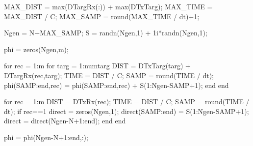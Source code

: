 \documentclass[12pt,openany,a4paper]{book}
\begin{document}
\begin{spverbatim}
MAX_DIST = max(DTargRx(:)) + max(DTxTarg);
MAX_TIME = MAX_DIST / C;
MAX_SAMP = round(MAX_TIME / dt)+1;

Ngen = N+MAX_SAMP;
S = randn(Ngen,1) + 1i*randn(Ngen,1);

phi = zeros(Ngen,m);

for rec = 1:m
    for targ = 1:numtarg
        DIST = DTxTarg(targ) + DTargRx(rec,targ);
        TIME = DIST / C;
        SAMP = round(TIME / dt);
        phi(SAMP:end,rec) = phi(SAMP:end,rec) + S(1:Ngen-SAMP+1);
    end
end

for rec = 1:m
    DIST = DTxRx(rec);
    TIME = DIST / C;
    SAMP = round(TIME / dt);
    if rec==1
        direct = zeros(Ngen,1);
        direct(SAMP:end) = S(1:Ngen-SAMP+1);
        direct = direct(Ngen-N+1:end);
    end
end
  
phi = phi(Ngen-N+1:end,:);
\end{spverbatim}
\end{document}
